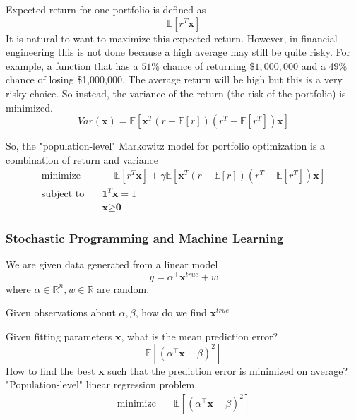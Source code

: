 Expected return for one portfolio is defined as
\begin{equation}
  \mathbb{E}[r^T \textbf{x}]
\end{equation}
It is natural to want to maximize this expected return. However, in financial engineering this is not done because a high average may still be quite risky. For example, a function that has a $51\%$ chance of returning $\$1,000,000$ and a 49\% chance of losing \$1,000,000. The average return will be high but this is a very risky choice. So instead, the variance of the return (the risk of the portfolio) is minimized.
\begin{equation}
  Var(\textbf{x}) = \mathbb{E}[\textbf{x}^T(r-\mathbb{E}[r])(r^T -\mathbb{E}[r^T])\textbf{x}]
\end{equation}

So, the "population-level" Markowitz model for portfolio optimization is a combination of return and variance
\begin{align}
  \text{minimize} & \quad -\mathbb{E}[r^T \textbf{x}] + \gamma \mathbb{E}[\textbf{x}^T(r-\mathbb{E}[r])(r^T -\mathbb{E}[r^T])\textbf{x}] \\
  \text{subject to} & \quad \textbf{1}^T \textbf{x} = 1 \\
  & \quad \textbf{x} \geq \textbf{0}
\end{align}

\subsubsection{Stochastic Programming and Machine Learning}
We are given data generated from a linear model
\begin{equation}
  y = \alpha^\top \textbf{x}^{true} + w
\end{equation}
where $\alpha \in \mathbb{R}^n, w \in \mathbb{R}$ are random.

Given observations about $\alpha, \beta$, how do we find $\textbf{x}^{true}$

Given fitting parameters $\textbf{x}$, what is the mean prediction error?
\begin{equation}
  \mathbb{E}[(\alpha^\top \textbf{x} - \beta)^2]
\end{equation}
How to find the best $\textbf{x}$ such that the prediction error is minimized on average? \\

"Population-level" linear regression problem.
\begin{align}
  \text{minimize} & \quad \mathbb{E}[(\alpha^\top \textbf{x} - \beta)^2]
\end{align}